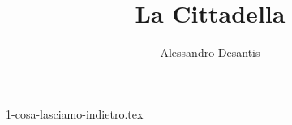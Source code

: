 \documentclass[a4paper,oneside,11pt]{memoir}
\title{La Cittadella}
\author{Alessandro Desantis}
\date{}
\begin{document}
    \begin{titlingpage}
        \maketitle
    \end{titlingpage}


    {1-cosa-lasciamo-indietro.tex}
\end{document}
